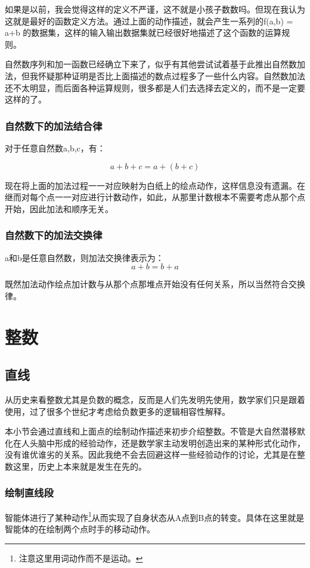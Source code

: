 \documentclass[12pt,oneside]{book}
\begin{document}
如果是以前，我会觉得这样的定义不严谨，这不就是小孩子数数吗。但现在我认为这就是最好的函数定义方法。通过上面的动作描述，就会产生一系列的f(a,b) = a+b 的数据集，这样的输入输出数据集就已经很好地描述了这个函数的运算规则。

自然数序列和加一函数已经确立下来了，似乎有其他尝试试着基于此推出自然数加法，但我怀疑那种证明是否比上面描述的数点过程多了一些什么内容。自然数加法还不太明显，而后面各种运算规则，很多都是人们去选择去定义的，而不是一定要这样的了。


\subsection{自然数下的加法结合律}
对于任意自然数a,b,c，有：

\begin{equation}
a + b + c = a + (b + c)
\end{equation}

现在将上面的加法过程一一对应映射为白纸上的绘点动作，这样信息没有遗漏。在继而对每个点一一对应进行计数动作，如此，从那里计数根本不需要考虑从那个点开始，因此加法和顺序无关。

\subsection{自然数下的加法交换律}
a和b是任意自然数，则加法交换律表示为：
\begin{equation}
a+b=b+a
\end{equation}

既然加法动作绘点加计数与从那个点那堆点开始没有任何关系，所以当然符合交换律。


\chapter{整数}
\section{直线}
从历史来看整数尤其是负数的概念，反而是人们先发明先使用，数学家们只是跟着使用，过了很多个世纪才考虑给负数更多的逻辑相容性解释\cite{高观点下的初等数学第一卷}。

本小节会通过直线和上面点的绘制动作描述来初步介绍整数。不管是大自然潜移默化在人头脑中形成的经验动作，还是数学家主动发明创造出来的某种形式化动作，没有谁优谁劣的关系。因此我绝不会去回避这样一些经验动作的讨论，尤其是在整数这里，历史上本来就是发生在先的。


\subsection{绘制直线段}
智能体进行了某种动作\footnote{注意这里用词动作而不是运动。}从而实现了自身状态从A点到B点的转变。具体在这里就是智能体的在绘制两个点时手的移动动作。
\end{document}
